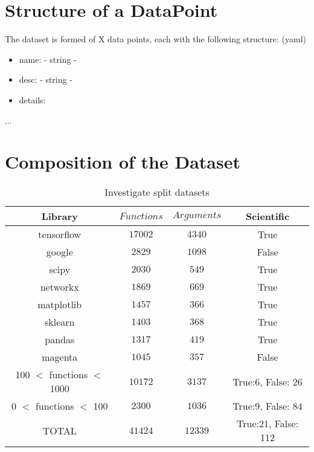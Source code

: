 
\section{Structure of a DataPoint} %
\label{sec:structure_of_datapoint}

The dataset is formed of X data points, each with the following structure: (yaml)
\begin{itemize}
    \item name: - string - 
    \item desc: - string - 
    \item details: 

\end{itemize}
...



\section{Composition of the Dataset} %
\label{sec:composition_of_the_dataset}


\begin{table}[h!]
\begin{center}
\begin{tabular}{c | c | c | c }
    Library      & $ Functions $     & $ Arguments $ & Scientific \\
\hline
    tensorflow   & $ 17002 $     & $ 4340 $ & True \\
    google   & $ 2829 $      & $ 1098 $ & False \\
    scipy    & $ 2030 $      & $ 549 $ & True \\
    networkx     & $ 1869 $      & $ 669 $ & True \\
    matplotlib   & $ 1457 $      & $ 366 $ & True \\
    sklearn      & $ 1403 $      & $ 368 $ & True \\
    pandas   & $ 1317 $      & $ 419 $ & True \\
    magenta      & $ 1045 $      & $ 357 $ & False \\
    100 $<$ functions $<$ 1000   & $ 10172 $     & $ 3137 $ & True:6, False: 26 \\
    0 $<$ functions $<$ 100      & $ 2300 $      & $ 1036 $ & True:9, False: 84 \\
\hline
\hline
    TOTAL    & $ 41424 $     & $ 12339 $ & True:21, False: 112 \\
\end{tabular}
\caption {Investigate split datasets}
\label{table:split_datasets_embed}
\end{center}
\end{table}

